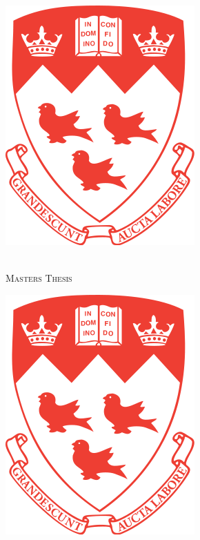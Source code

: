 \documentclass[
12pt, %
oneside, %
english, %
doublespacing, %
]{MastersDoctoralThesis} %
\author{Jonah \textsc{Caplan}} %
\begin{document}
\frontmatter %

\pagestyle{plain} %


\begin{titlepage}
\begin{center}


\begin{minipage}{0.2\textwidth}
\begin{flushleft} 
\includegraphics[scale=0.25]{Figures/McGillLogo.png}
\end{flushleft}
\end{minipage}
\begin{minipage}{0.5\textwidth}
    \begin{center}
	\textsc{\LARGE \univname}\\[1.5cm] %
	\textsc{\Large Masters Thesis}\\[0.5cm] %
        \end{center} 
\end{minipage}
\begin{minipage}{0.2\textwidth}
\begin{flushright}
\includegraphics[scale=0.25]{Figures/McGillLogo.png}

\end{flushright}
\end{minipage}
\end{center}
\end{titlepage}
\end{document}
